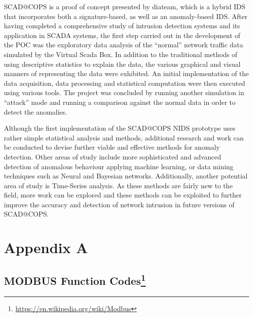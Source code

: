 \documentclass[11pt,]{article}
\begin{document}
SCAD@COPS is a proof of concept presented by diateam, which is a hybrid
IDS that incorporates both a signature-based, as well as an
anomaly-based IDS. After having completed a comprehensive study of
intrusion detection systems and its application in SCADA systems, the
first step carried out in the development of the POC was the exploratory
data analysis of the ``normal'' network traffic data simulated by the
Virtual Scada Box. In addition to the traditional methods of using
descriptive statistics to explain the data, the various graphical and
visual manners of representing the data were exhibited. An initial
implementation of the data acquisition, data processing and statistical
computation were then executed using various tools. The project was
concluded by running another simulation in ``attack'' mode and running a
comparison against the normal data in order to detect the anomalies.

Although the first implementation of the SCAD@COPS NIDS prototype uses
rather simple statistical analysis and methods, additional research and
work can be conducted to devise further viable and effective methods for
anomaly detection. Other areas of study include more sophisticated and
advanced detection of anomalous behaviour applying machine learning, or
data mining techniques such as Neural and Bayesian networks.
Additionally, another potential area of study is Time-Series analysis.
As these methods are fairly new to the field, more work can be explored
and these methods can be exploited to further improve the accuracy and
detection of network intrusion in future versions of SCAD@COPS.

\clearpage

\section*{Appendix A}\label{appendix-a}

\subsection*{MODBUS Function Codes\footnote{\url{https://en.wikipedia.org/wiki/Modbus}}}\label{modbus-function-codes4}
\end{document}
